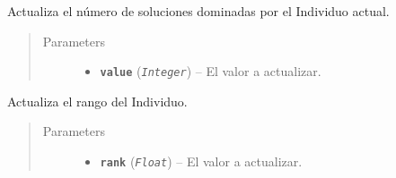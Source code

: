\documentclass[class=report, crop=false]{standalone}
\begin{document}
\begin{fulllineitems}
\begin{fulllineitems}
Actualiza el número de soluciones dominadas por el
Individuo actual.

\begin{quote}\begin{description}
\item[{Parameters}] \leavevmode\begin{itemize}
\item \textbf{\texttt{value}} (\emph{\texttt{Integer}}) -- El valor a actualizar.
\end{itemize}
\end{description}\end{quote}

\end{fulllineitems}

\begin{fulllineitems}

Actualiza el rango del Individuo.

\begin{quote}\begin{description}
\item[{Parameters}] \leavevmode\begin{itemize}
\item \textbf{\texttt{rank}} (\emph{\texttt{Float}}) -- El valor a actualizar.
\end{itemize}
\end{description}\end{quote}

\end{fulllineitems}

\end{fulllineitems}

\end{document}
